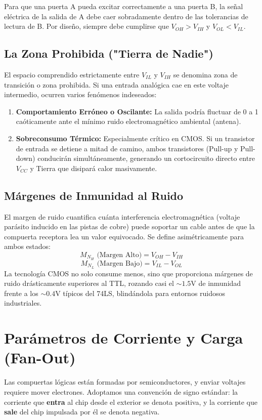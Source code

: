 Para que una puerta A pueda excitar correctamente a una puerta B, la señal eléctrica de la salida de A debe caer sobradamente dentro de las tolerancias de lectura de B. Por diseño, siempre debe cumplirse que $V_{OH} > V_{IH}$ y $V_{OL} < V_{IL}.$

\subsection{La Zona Prohibida ("Tierra de Nadie")}
El espacio comprendido estrictamente entre $V_{IL}$ y $V_{IH}$ se denomina zona de transición o zona prohibida. Si una entrada analógica cae en este voltaje intermedio, ocurren varios fenómenos indeseados:
\begin{enumerate}
    \item \textbf{Comportamiento Erróneo o Oscilante:} La salida podría fluctuar de 0 a 1 caóticamente ante el mínimo ruido electromagnético ambiental (antena).
    \item \textbf{Sobreconsumo Térmico:} Especialmente crítico en CMOS. Si un transistor de entrada se detiene a mitad de camino, ambos transistores (Pull-up y Pull-down) conducirán simultáneamente, generando un cortocircuito directo entre $V_{CC}$ y Tierra que disipará calor masivamente.
\end{enumerate}

\subsection{Márgenes de Inmunidad al Ruido}
El margen de ruido cuantifica cuánta interferencia electromagnética (voltaje parásito inducido en las pistas de cobre) puede soportar un cable antes de que la compuerta receptora lea un valor equivocado. Se define asimétricamente para ambos estados:
\[ M_{N_H} \text{ (Margen Alto)} = V_{OH} - V_{IH} \]
\[ M_{N_L} \text{ (Margen Bajo)} = V_{IL} - V_{OL} \]
La tecnología CMOS no solo consume menos, sino que proporciona márgenes de ruido drásticamente superiores al TTL, rozando casi el $\sim 1.5\text{V}$ de inmunidad frente a los $\sim 0.4\text{V}$ típicos del 74LS, blindándola para entornos ruidosos industriales.

\section{Parámetros de Corriente y Carga (Fan-Out)}

Las compuertas lógicas están formadas por semiconductores, y enviar voltajes requiere mover electrones. 
Adoptamos una convención de signo estándar: la corriente que \textbf{entra} al chip desde el exterior se denota positiva, y la corriente que \textbf{sale} del chip impulsada por él se denota negativa.

